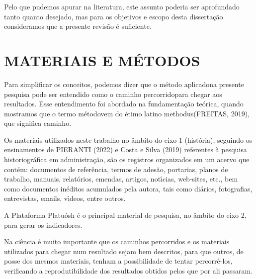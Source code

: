 \documentclass[
12pt,		%
openright,	%
twoside,  %
a4paper,			%
chapter=TITLE,		%
english,			%
french,				%
spanish,			%
brazil				%
]{USPSC-classe/USPSC}
\begin{document}
Pelo que pudemos apurar na literatura, este assunto poderia ser aprofundado tanto quanto desejado, mas para os objetivos e escopo desta disserta\c{c}\~ao consideramos que a presente revis\~ao \'e suficiente.










\chapter[MATERIAIS E M\'ETODOS]{MATERIAIS E M\'ETODOS}\label{MATERIAIS E M\'ETODOS}
Para simplificar os conceitos, podemos dizer que o \textquotedbl m\'etodo aplicado\textquotedbl  na presente pesquisa pode ser entendido como o \textquotedbl caminho percorrido\textquotedbl  para chegar aos resultados. Esse entendimento  foi abordado  na fundamenta\c{c}\~ao te\'orica, quando mostramos que o termo \textquotedbl m\'etodo\textquotedbl  vem do \'etimo latino \textquotedbl methodus\textquotedbl   (FREITAS, 2019), que significa \textquotedbl caminho\textquotedbl .










Os materiais utilizados neste trabalho no \^ambito do eixo 1 (hist\'oria), seguindo os ensinamentos de  PIERANTI (2022) e  Costa e Silva (2019) referentes \`a pesquisa historiogr\'afica em administra\c{c}\~ao,  s\~ao os registros organizados em um acervo que cont\'em: documentos de refer\^encia, termos de ades\~ao, portarias, planos de trabalho, manuais, relat\'orios, emendas, artigos, not\'{\i}cias, web-sites, etc., bem como documentos in\'editos acumulados pela autora, tais como di\'arios, fotografias, entrevistas, emails, v\'{\i}deos, entre outros.










A Plataforma Platu\'osh \'e o principal material de pesquisa, no \^ambito do eixo 2, para gerar os indicadores.










Na ci\^encia \'e muito importante que os caminhos percorridos e os materiais utilizados para chegar num resultado sejam bem descritos, para que outros, de posse dos mesmos materiais, tenham a possibilidade de tentar percorr\^e-los, verificando a reprodutibilidade dos resultados obtidos pelos que por ali passaram.
\end{document}
